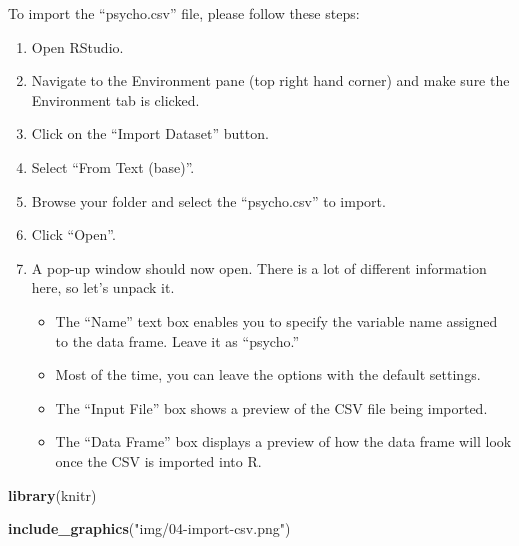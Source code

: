 \documentclass[
]{book}
\newenvironment{Shaded}{\begin{snugshade}}{\end{snugshade}}
\newcommand{\FunctionTok}[1]{\textcolor[rgb]{0.13,0.29,0.53}{\textbf{#1}}}
\newcommand{\NormalTok}[1]{#1}
\newcommand{\StringTok}[1]{\textcolor[rgb]{0.31,0.60,0.02}{#1}}
\begin{document}
To import the ``psycho.csv'' file, please follow these steps:

\begin{enumerate}
\def\labelenumi{\arabic{enumi}.}
\item
  Open RStudio.
\item
  Navigate to the Environment pane (top right hand corner) and make sure the Environment tab is clicked.
\item
  Click on the ``Import Dataset'' button.
\item
  Select ``From Text (base)''.
\item
  Browse your folder and select the ``psycho.csv'' to import.
\item
  Click ``Open''.
\item
  A pop-up window should now open. There is a lot of different information here, so let's unpack it.

  \begin{itemize}
  \item
    The ``Name'' text box enables you to specify the variable name assigned to the data frame. Leave it as ``psycho.''
  \item
    Most of the time, you can leave the options with the default settings.
  \item
    The ``Input File'' box shows a preview of the CSV file being imported.
  \item
    The ``Data Frame'' box displays a preview of how the data frame will look once the CSV is imported into R.
  \end{itemize}
\end{enumerate}

\begin{Shaded}
\begin{Highlighting}[]
\FunctionTok{library}\NormalTok{(knitr)}

\FunctionTok{include\_graphics}\NormalTok{(}\StringTok{"img/04{-}import{-}csv.png"}\NormalTok{)}
\end{Highlighting}
\end{Shaded}
\end{document}
